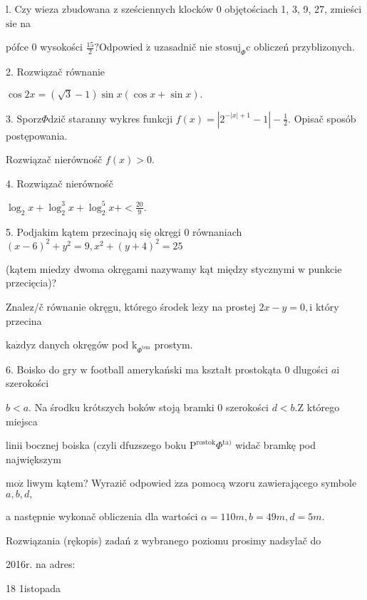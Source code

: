 \documentclass[a4paper,12pt]{article}
\begin{document}
l. Czy wieza zbudowana $\mathrm{z}$ sześciennych klocków $0$ objętościach 1, 3, 9, 27, zmieści $\mathrm{s}\mathrm{i}\mathrm{e}$ na

pófce $0$ wysokości $\displaystyle \frac{15}{2}?$Odpowied $\acute{\mathrm{z}}$ uzasadnič nie $\mathrm{s}\mathrm{t}\mathrm{o}\mathrm{s}\mathrm{u}\mathrm{j}_{\Phi}\mathrm{c}$ obliczeń przyblizonych.

2. Rozwiązač równanie

$\cos 2x=(\sqrt{3}-1)\sin x(\cos x+\sin x).$

3. Sporz$\Phi$dzič staranny wykres funkcji $f(x)=|2^{-|x|+1}-1|-\displaystyle \frac{1}{2}$. Opisač sposób postępowania.

Rozwiązač nierównośč $f(x)>0.$

4. Rozwiązač nierównośč

$\displaystyle \log_{2}x+\log_{2}^{3}x+\log_{2}^{5}x+<\frac{20}{9}.$

5. Podjakim kątem przecinajq się okręgi $0$ równaniach $(x-6)^{2}+y^{2}=9, x^{2}+(y+4)^{2}=25$

(kątem miedzy dwoma okręgami nazywamy kąt między stycznymi $\mathrm{w}$ punkcie przecięcia)?

Znalez/č równanie okręgu, którego środek $\mathrm{l}\mathrm{e}\dot{\mathrm{z}}\mathrm{y}$ na prostej $2x-y=0, \mathrm{i}$ który przecina

$\mathrm{k}\mathrm{a}\dot{\mathrm{z}}\mathrm{d}\mathrm{y}\mathrm{z}$ danych okręgów pod $\mathrm{k}_{\Phi^{\mathrm{t}\mathrm{e}\mathrm{m}}}$ prostym.

6. Boisko do gry $\mathrm{w}$ football amerykański ma kształt prostokąta $0$ dlugości $a\mathrm{i}$ szerokości

$b<a$. Na środku krótszych boków stoją bramki $0$ szerokości $d<b. \mathrm{Z}$ którego miejsca

linii bocznej boiska (czyli dfuzszego boku $\mathrm{P}^{\mathrm{r}\mathrm{o}\mathrm{s}\mathrm{t}\mathrm{o}\mathrm{k}}\Phi^{\mathrm{t}\mathrm{a})}$ widač bramkę pod największym

$\mathrm{m}\mathrm{o}\dot{\mathrm{z}}$ liwym kątem? Wyrazič odpowied $\acute{\mathrm{z}}\mathrm{z}\mathrm{a}$ pomocą wzoru zawierającego symbole $a, b, d,$

a następnie wykonač obliczenia dla wartości $\alpha=110m, b=49m, d=5m.$

Rozwiązania (rękopis) zadań z wybranego poziomu prosimy nadsylač do

2016r. na adres:

18 1istopada
\end{document}
